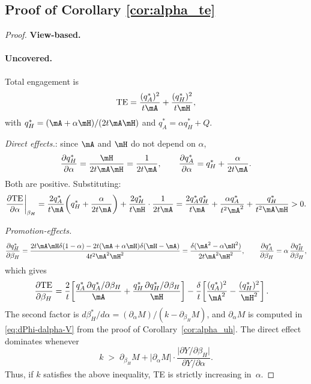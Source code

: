 \subsection*{Proof of Corollary \ref{cor:alpha_te}}
\begin{proof}
\textbf{View-based.}
\paragraph{Uncovered.}\;
Total engagement is
\begin{align*}
\text{TE} = \frac{(q_A^*)^2}{t\mA} + \frac{(q_H^*)^2}{t\mH},
\end{align*}
with $q_H^* = (\mA+\alpha\mH)/(2t\mA\mH)$ and $q_A^* = \alpha q_H^* + Q$.

\emph{Direct effects.}: since $\mA$ and $\mH$
do not depend on $\alpha$,
\[
\frac{\partial q_H^*}{\partial\alpha}
= \frac{\mH}{2t\mA\mH} = \frac{1}{2t\mA},
\qquad
\frac{\partial q_A^*}{\partial\alpha} = q_H^* + \frac{\alpha}{2t\mA}.
\]
Both are positive. Substituting:
\[
\frac{\partial\text{TE}}{\partial\alpha}\bigg|_{\beta_H}
= \frac{2q_A^*}{t\mA}\!\left(q_H^* + \frac{\alpha}{2t\mA}\right)
+ \frac{2q_H^*}{t\mH}\cdot\frac{1}{2t\mA}
= \frac{2q_A^* q_H^*}{t\mA} + \frac{\alpha q_A^*}{t^2\mA^2} + \frac{q_H^*}{t^2\mA\mH} > 0.
\]

\emph{Promotion-effects.} 
\[
\frac{\partial q_H^*}{\partial\beta_H}
= \frac{2t\mA\mH\delta(1-\alpha) - 2t(\mA+\alpha\mH)\delta(\mH-\mA)}{4t^2\mA^2\mH^2} 
=\frac{\delta(\mA^2 - \alpha\mH^2)}{2t\mA^2\mH^2},
\qquad
\frac{\partial q_A^*}{\partial\beta_H} = \alpha\,\frac{\partial q_H^*}{\partial\beta_H},
\]
which gives
\begin{align*}
\frac{\partial\text{TE}}{\partial\beta_H}
&= \frac{2}{t}\!\left[\frac{q_A^*\,\partial q_A^*/\partial\beta_H}{\mA}
   + \frac{q_H^*\,\partial q_H^*/\partial\beta_H}{\mH}\right]
   - \frac{\delta}{t}\!\left[\frac{(q_A^*)^2}{\mA^2} - \frac{(q_H^*)^2}{\mH^2}\right].
\end{align*}
The second factor is
$d\beta_H^*/d\alpha = (\partial_\alpha M)/(k - \partial_{\beta_H}M)$, and $\partial_\alpha M$ is computed in \eqref{eq:dPhi-dalpha-V} from the proof of Corollary~\ref{cor:alpha_uh}. The direct effect dominates whenever
\begin{equation}\label{eq:kbar-alpha-Y-V}
k \;>\; \partial_{\beta_H} M
+ \bigl|\partial_\alpha M\bigr|\cdot
\frac{\bigl|\partial Y/\partial\beta_H\bigr|}{\partial Y/\partial\alpha}.
\end{equation}
Thus, if $k$ satisfies the above inequality, TE is strictly increasing in~$\alpha$.


\end{proof}
